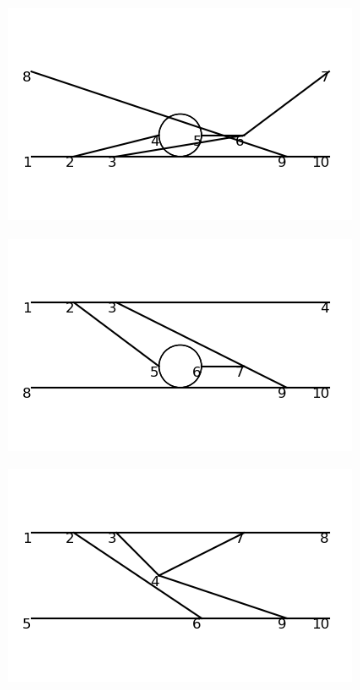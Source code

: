 \documentclass[11pt,a4paper,twoside,pdf]{article}
\numberwithin{equation}{section}
\begin{document}
\begin{figure}[h!]
\begin{subfigure}[t]{0.16\textwidth}
    \end{subfigure}
    \hfill
    \begin{subfigure}[t]{0.16\textwidth}
        \centering
        \includegraphics[width=\textwidth]{plots/order6_2to2/54.png}
    \end{subfigure}
    \hfill
    \begin{subfigure}[t]{0.16\textwidth}
        \centering
        \includegraphics[width=\textwidth]{plots/order6_2to2/55.png}
    \end{subfigure}
    \hfill
    \begin{subfigure}[t]{0.16\textwidth}
        \centering
        \includegraphics[width=\textwidth]{plots/order6_2to2/56.png}

\end{subfigure}
\end{figure}
\end{document}
